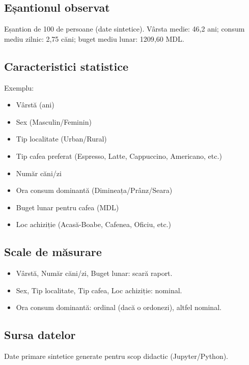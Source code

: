 \documentclass[12pt,a4paper]{report}
\begin{document}
\subsection{Eșantionul observat}
Eșantion de 100 de persoane (date sintetice). Vârsta medie: 46{,}2 ani; consum mediu zilnic: 2{,}75 căni; buget mediu lunar: 1209{,}60 MDL.

\subsection{Caracteristici statistice}
Exemplu:
\begin{itemize}[leftmargin=1.2cm]
  \item Vârstă (ani)
  \item Sex (Masculin/Feminin)
  \item Tip localitate (Urban/Rural)
  \item Tip cafea preferat (Espresso, Latte, Cappuccino, Americano, etc.)
  \item Număr căni/zi
  \item Ora consum dominantă (Dimineața/Prânz/Seara)
  \item Buget lunar pentru cafea (MDL)
  \item Loc achiziție (Acasă-Boabe, Cafenea, Oficiu, etc.)
\end{itemize}

\subsection{Scale de măsurare}
\begin{itemize}[leftmargin=1.2cm]
  \item Vârstă, Număr căni/zi, Buget lunar: scară raport.
  \item Sex, Tip localitate, Tip cafea, Loc achiziție: nominal.
  \item Ora consum dominantă: ordinal (dacă o ordonezi), altfel nominal.
\end{itemize}

\subsection{Sursa datelor}
Date primare sintetice generate pentru scop didactic (Jupyter/Python).
\end{document}
